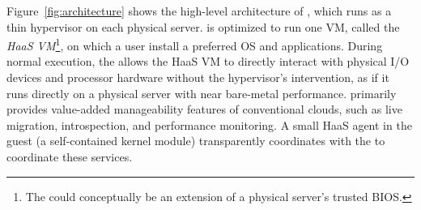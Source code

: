 Figure~\ref{fig:architecture} shows the high-level
architecture of \sna, which runs as a thin hypervisor on each
physical server. \na is optimized to run one VM, called the 
{\em HaaS VM}\footnote{The \na could conceptually be an extension of a physical server's trusted BIOS.}, 
on which  a user install a preferred OS and applications. 
During normal execution, the \na allows 
the HaaS VM to directly interact with physical I/O devices and processor hardware
without the hypervisor's intervention, 
as if it runs directly on a physical server with near bare-metal performance.
\na primarily provides value-added manageability 
features of conventional clouds, such as live
migration, introspection, and performance monitoring.
A small HaaS agent in the guest (a self-contained kernel module)
transparently coordinates with the \na to coordinate these services.


